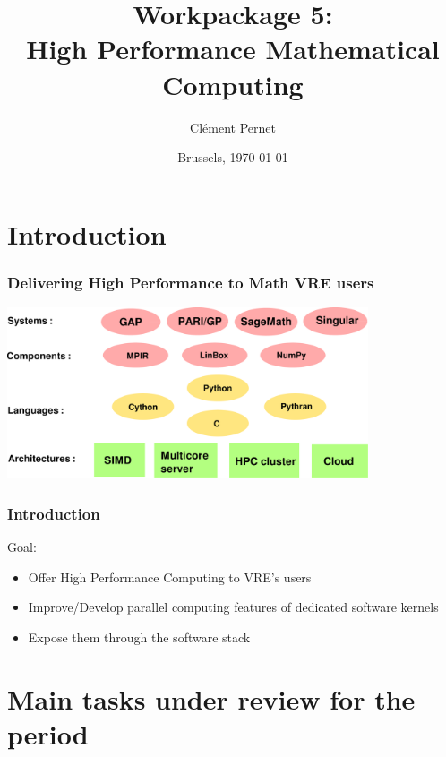 \documentclass{beamer}
\title[Workpackage 5]{Workpackage 5:\\ High Performance Mathematical Computing}
\author{Clément Pernet}
\institute[ODK Project review]{First OpenDreamKit Project review}
\date{Brussels, \today}
\begin{document}
\maketitle

\section*{Introduction}
\begin{frame}
  \frametitle{Delivering High Performance to Math VRE users}
   \begin{center}
    \includegraphics[width=0.8\textwidth]{software_stack}

  \end{center}

\end{frame}

\begin{frame}
  \frametitle{Introduction}
  \begin{block}
    {Goal:}
    \begin{itemize}
    \item Offer High Performance Computing to VRE's users
    \item Improve/Develop parallel computing features of dedicated software
      kernels
    \item Expose them through the software stack
    \end{itemize}
  \end{block}
\end{frame}
\section{Main tasks under review for the period}
\end{document}
